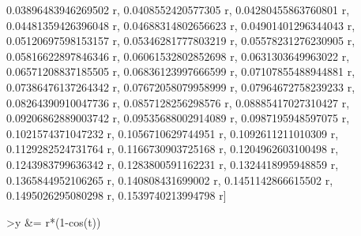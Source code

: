 \documentclass[a4paper,10pt]{article}
\begin{document}
\begin{eulernotebook}
\begin{eulercomment}
\begin{eulercomment}
\begin{eulercomment}
\begin{eulercomment}
\begin{eulercomment}
\begin{eulercomment}
\begin{eulercomment}
\begin{eulercomment}
\begin{eulercomment}
\begin{eulercomment}
\begin{eulercomment}
\begin{eulercomment}
\begin{eulercomment}
\begin{eulercomment}
\begin{eulercomment}
\begin{eulercomment}
\begin{eulercomment}
\begin{eulercomment}
\begin{eulercomment}
\begin{eulercomment}
\begin{eulercomment}
\begin{eulercomment}
\begin{eulercomment}
\begin{eulercomment}
\begin{eulercomment}
\begin{eulercomment}
\begin{eulercomment}
\begin{eulercomment}
\begin{euleroutput}
  0.03896483946269502 r, 0.0408552420577305 r, 0.04280455863760801 r, 
  0.04481359426396048 r, 0.04688314802656623 r, 0.04901401296344043 r, 
  0.05120697598153157 r, 0.05346281777803219 r, 0.05578231276230905 r, 
  0.05816622897846346 r, 0.06061532802852698 r, 0.0631303649963022 r, 
  0.06571208837185505 r, 0.06836123997666599 r, 0.07107855488944881 r, 
  0.07386476137264342 r, 0.07672058079958999 r, 0.07964672758239233 r, 
  0.08264390910047736 r, 0.0857128256298576 r, 0.08885417027310427 r, 
  0.09206862889003742 r, 0.09535688002914089 r, 0.0987195948597075 r, 
  0.1021574371047232 r, 0.1056710629744951 r, 0.1092611211010309 r, 
  0.1129282524731764 r, 0.1166730903725168 r, 0.1204962603100498 r, 
  0.1243983799636342 r, 0.1283800591162231 r, 0.1324418995948859 r, 
  0.1365844952106265 r, 0.140808431699002 r, 0.1451142866615502 r, 
  0.1495026295080298 r, 0.1539740213994798 r]
  
\end{euleroutput}
\begin{eulerprompt}
>y &= r*(1-cos(t))
\end{eulerprompt}
\begin{euleroutput}
  

\end{euleroutput}
\end{eulercomment}
\end{eulercomment}
\end{eulercomment}
\end{eulercomment}
\end{eulercomment}
\end{eulercomment}
\end{eulercomment}
\end{eulercomment}
\end{eulercomment}
\end{eulercomment}
\end{eulercomment}
\end{eulercomment}
\end{eulercomment}
\end{eulercomment}
\end{eulercomment}
\end{eulercomment}
\end{eulercomment}
\end{eulercomment}
\end{eulercomment}
\end{eulercomment}
\end{eulercomment}
\end{eulercomment}
\end{eulercomment}
\end{eulercomment}
\end{eulercomment}
\end{eulercomment}
\end{eulercomment}
\end{eulercomment}
\end{eulernotebook}
\end{document}
